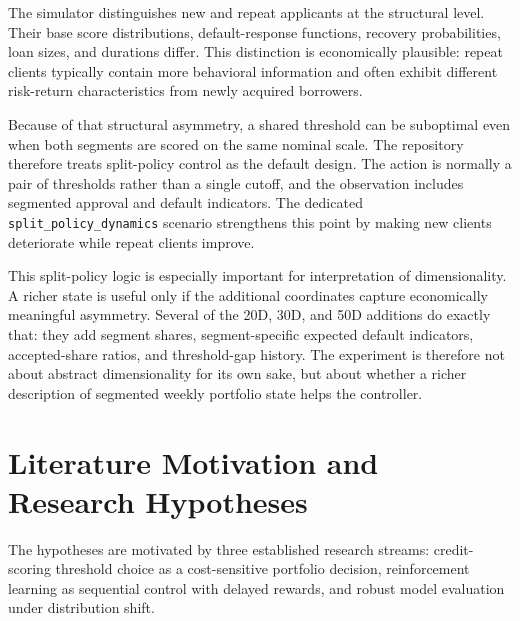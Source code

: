 \documentclass[12pt,a4paper]{article}
\begin{document}
The simulator distinguishes new and repeat applicants at the structural level. Their base score distributions, default-response functions, recovery probabilities, loan sizes, and durations differ. This distinction is economically plausible: repeat clients typically contain more behavioral information and often exhibit different risk-return characteristics from newly acquired borrowers.

Because of that structural asymmetry, a shared threshold can be suboptimal even when both segments are scored on the same nominal scale. The repository therefore treats split-policy control as the default design. The action is normally a pair of thresholds rather than a single cutoff, and the observation includes segmented approval and default indicators. The dedicated \texttt{split\_policy\_dynamics} scenario strengthens this point by making new clients deteriorate while repeat clients improve.

This split-policy logic is especially important for interpretation of dimensionality. A richer state is useful only if the additional coordinates capture economically meaningful asymmetry. Several of the 20D, 30D, and 50D additions do exactly that: they add segment shares, segment-specific expected default indicators, accepted-share ratios, and threshold-gap history. The experiment is therefore not about abstract dimensionality for its own sake, but about whether a richer description of segmented weekly portfolio state helps the controller.

\section{Literature Motivation and Research Hypotheses}

The hypotheses are motivated by three established research streams: credit-scoring threshold choice as a cost-sensitive portfolio decision, reinforcement learning as sequential control with delayed rewards, and robust model evaluation under distribution shift.
\end{document}
